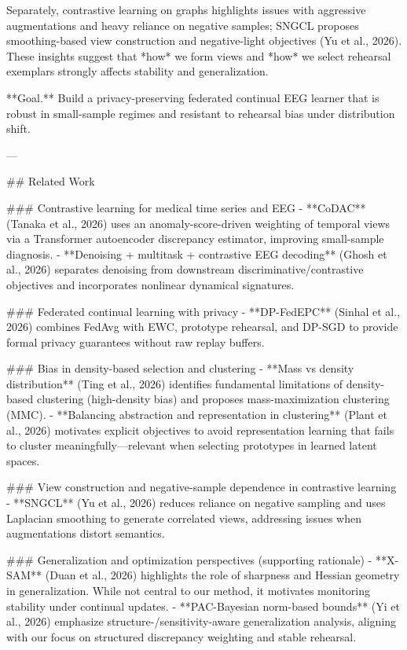 Separately, contrastive learning on graphs highlights issues with aggressive augmentations and heavy reliance on negative samples; SNGCL proposes smoothing-based view construction and negative-light objectives (Yu et al., 2026). These insights suggest that *how* we form views and *how* we select rehearsal exemplars strongly affects stability and generalization.

**Goal.** Build a privacy-preserving federated continual EEG learner that is robust in small-sample regimes and resistant to rehearsal bias under distribution shift.

---

## Related Work  

### Contrastive learning for medical time series and EEG  
- **CoDAC** (Tanaka et al., 2026) uses an anomaly-score-driven weighting of temporal views via a Transformer autoencoder discrepancy estimator, improving small-sample diagnosis.  
- **Denoising + multitask + contrastive EEG decoding** (Ghosh et al., 2026) separates denoising from downstream discriminative/contrastive objectives and incorporates nonlinear dynamical signatures.

### Federated continual learning with privacy  
- **DP-FedEPC** (Sinhal et al., 2026) combines FedAvg with EWC, prototype rehearsal, and DP-SGD to provide formal privacy guarantees without raw replay buffers.

### Bias in density-based selection and clustering  
- **Mass vs density distribution** (Ting et al., 2026) identifies fundamental limitations of density-based clustering (high-density bias) and proposes mass-maximization clustering (MMC).  
- **Balancing abstraction and representation in clustering** (Plant et al., 2026) motivates explicit objectives to avoid representation learning that fails to cluster meaningfully—relevant when selecting prototypes in learned latent spaces.

### View construction and negative-sample dependence in contrastive learning  
- **SNGCL** (Yu et al., 2026) reduces reliance on negative sampling and uses Laplacian smoothing to generate correlated views, addressing issues when augmentations distort semantics.

### Generalization and optimization perspectives (supporting rationale)  
- **X-SAM** (Duan et al., 2026) highlights the role of sharpness and Hessian geometry in generalization. While not central to our method, it motivates monitoring stability under continual updates.  
- **PAC-Bayesian norm-based bounds** (Yi et al., 2026) emphasize structure-/sensitivity-aware generalization analysis, aligning with our focus on structured discrepancy weighting and stable rehearsal.

